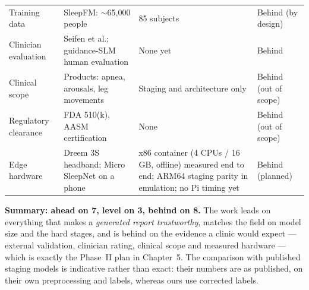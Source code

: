 \begin{table}[htbp]
\begin{tabularx}{\textwidth}{p{}YYp{0.14\textwidth}}
Training data & SleepFM: $\sim$65,000 people & 85 subjects & Behind (by design) \\
Clinician evaluation & Seifen et al.; guidance-SLM human evaluation & None yet & Behind \\
Clinical scope & Products: apnea, arousals, leg movements & Staging and architecture only & Behind (out of scope) \\
Regulatory clearance & FDA 510(k), AASM certification & None & Behind (out of scope) \\
Edge hardware & Dreem 3S headband; Micro SleepNet on a phone & x86 container (4 CPUs / 16\,GB, offline) measured end to end; ARM64 staging parity in emulation; no Pi timing yet & Behind (planned) \\
\bottomrule
\end{tabularx}
\end{table}

\textbf{Summary: ahead on 7, level on 3, behind on 8.} The work leads on everything that makes a \emph{generated
report trustworthy}, matches the field on model size and the hard stages, and is behind on the evidence a clinic
would expect --- external validation, clinician rating, clinical scope and measured hardware --- which is exactly
the Phase~II plan in Chapter~5. The comparison with published staging models is indicative rather than exact:
their numbers are as published, on their own preprocessing and labels, whereas ours use corrected labels.
